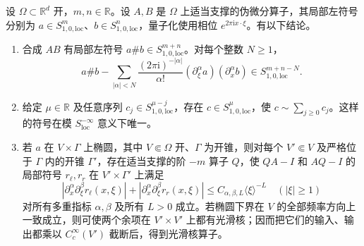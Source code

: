 \begin{theorem}
\label{b2:thm:G-calculus}
设 \(\Omega\subset\mathbb R^d\) 开，\(m,n\in\mathbb R\)。设 \(A,B\) 是 \(\Omega\) 上适当支撑的伪微分算子，其局部左符号分别为 \(a\in S^m_{1,0,\mathrm{loc}}\)、\(b\in S^n_{1,0,\mathrm{loc}}\)，量子化使用相位 \(e^{2\pi\mathrm ix\cdot\xi}\)。有以下结论。
\begin{enumerate}
\item\label{b2:item:G-calculus-composition}合成 \(AB\) 有局部左符号 \(a\#b\in S^{m+n}_{1,0,\mathrm{loc}}\)。对每个整数 \(N\ge1\)，
\[
 a\#b-\sum_{|\alpha|<N}
    \frac{(2\pi\mathrm i)^{-|\alpha|}}{\alpha!}
       (\partial_\xi^\alpha a)(\partial_x^\alpha b)
 \in S^{m+n-N}_{1,0,\mathrm{loc}}.
\]
\item\label{b2:item:G-calculus-summation}给定 \(\mu\in\mathbb R\) 及任意序列 \(c_j\in S^{\mu-j}_{1,0,\mathrm{loc}}\)，存在 \(c\in S^\mu_{1,0,\mathrm{loc}}\)，使 \(c\sim\sum_{j\ge0}c_j\)。这样的符号在模 \(S^{-\infty}_{\mathrm{loc}}\) 意义下唯一。
\item\label{b2:item:G-calculus-parametrix}若 \(a\) 在 \(V\times\Gamma\) 上椭圆，其中 \(V\Subset\Omega\) 开、\(\Gamma\) 为开锥，则对每个 \(V'\Subset V\) 及严格位于 \(\Gamma\) 内的开锥 \(\Gamma'\)，存在适当支撑的阶 \(-m\) 算子 \(Q\)，使 \(QA-I\) 和 \(AQ-I\) 的局部符号 \(r_\ell,r_r\) 在 \(V'\times\Gamma'\) 上满足
\[
 |\partial_x^\alpha\partial_\xi^\beta r_\ell(x,\xi)|
 +|\partial_x^\alpha\partial_\xi^\beta r_r(x,\xi)|
 \le C_{\alpha,\beta,L}\langle\xi\rangle^{-L}
 \quad(|\xi|\ge1)
\]
对所有多重指标 \(\alpha,\beta\) 及所有 \(L>0\) 成立。若椭圆下界在 \(V\) 的全部频率方向上一致成立，则可使两个余项在 \(V'\times V'\) 上都有光滑核；因而把它们的输入、输出都乘以 \(C_c^\infty(V')\) 截断后，得到光滑核算子。
\end{enumerate}
\end{theorem}
